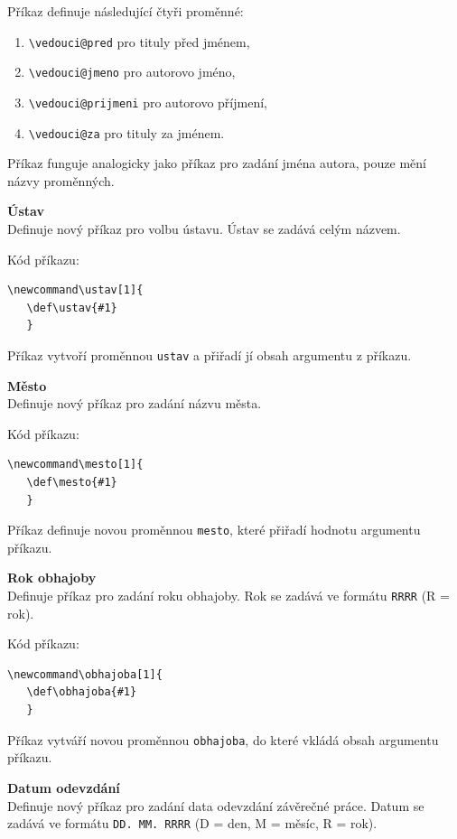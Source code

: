 Příkaz definuje následující čtyři proměnné:

\begin{enumerate}
	\item \verb|\vedouci@pred| pro tituly před jménem,
	\item \verb|\vedouci@jmeno| pro autorovo jméno,
	\item \verb|\vedouci@prijmeni| pro autorovo příjmení,
	\item \verb|\vedouci@za| pro tituly za jménem.
\end{enumerate}

Příkaz funguje analogicky jako příkaz pro zadání jména autora, pouze mění názvy proměnných.

\vspace{8pt}
\textbf{Ústav}\\
Definuje nový příkaz pro volbu ústavu. Ústav se zadává celým názvem.

Kód příkazu:

\begin{verbatim}
\newcommand\ustav[1]{
   \def\ustav{#1}
   }
\end{verbatim}

Příkaz vytvoří proměnnou \verb|ustav| a přiřadí jí obsah argumentu z příkazu.

\vspace{8pt}
\textbf{Město}\\
Definuje nový příkaz pro zadání názvu města.

Kód příkazu:

\begin{verbatim}
\newcommand\mesto[1]{
   \def\mesto{#1}
   }
\end{verbatim}

Příkaz definuje novou proměnnou \verb|mesto|, které přiřadí hodnotu argumentu příkazu.

\vspace{8pt}
\textbf{Rok obhajoby}\\
Definuje příkaz pro zadání roku obhajoby. Rok se zadává ve formátu \verb|RRRR| (R = rok).

Kód příkazu:

\begin{verbatim}
\newcommand\obhajoba[1]{
   \def\obhajoba{#1}
   }
\end{verbatim}

Příkaz vytváří novou proměnnou \verb|obhajoba|, do které vkládá obsah argumentu příkazu.

\vspace{8pt}
\textbf{Datum odevzdání}\\
Definuje nový příkaz pro zadání data odevzdání závěrečné práce. Datum se zadává ve formátu \verb|DD. MM. RRRR| (D = den, M = měsíc, R = rok).

